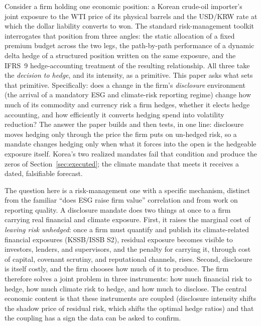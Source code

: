 \documentclass[11pt,a4paper]{article}
\begin{document}
Consider a firm holding one economic position: a Korean crude-oil importer's joint exposure to the WTI price of its physical barrels and the USD/KRW rate at which the dollar liability converts to won. The standard risk-management toolkit interrogates that position from three angles: the static allocation of a fixed premium budget across the two legs, the path-by-path performance of a dynamic delta hedge of a structured position written on the same exposure, and the IFRS~9 hedge-accounting treatment of the resulting relationship. All three take the \emph{decision to hedge}, and its intensity, as a primitive. This paper asks what sets that primitive. Specifically: does a change in the firm's \emph{disclosure} environment (the arrival of a mandatory ESG and climate-risk reporting regime) change how much of its commodity and currency risk a firm hedges, whether it elects hedge accounting, and how efficiently it converts hedging spend into volatility reduction? The answer the paper builds and then tests, in one line: disclosure moves hedging only through the price the firm puts on un-hedged risk, so a mandate changes hedging only when what it forces into the open is the hedgeable exposure itself. Korea's two realized mandates fail that condition and produce the zeros of Section~\ref{sec:executed}; the climate mandate that meets it receives a dated, falsifiable forecast.

The question here is a risk-management one with a specific mechanism, distinct from the familiar ``does ESG raise firm value'' correlation and from work on reporting quality. A disclosure mandate does two things at once to a firm carrying real financial and climate exposure. First, it raises the marginal cost of \emph{leaving risk unhedged}: once a firm must quantify and publish its climate-related financial exposures (KSSB/ISSB S2), residual exposure becomes visible to investors, lenders, and supervisors, and the penalty for carrying it, through cost of capital, covenant scrutiny, and reputational channels, rises. Second, disclosure is itself costly, and the firm chooses how much of it to produce. The firm therefore solves a joint problem in three instruments: how much financial risk to hedge, how much climate risk to hedge, and how much to disclose. The central economic content is that these instruments are coupled (disclosure intensity shifts the shadow price of residual risk, which shifts the optimal hedge ratios) and that the coupling has a sign the data can be asked to confirm.
\end{document}
